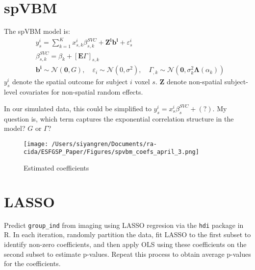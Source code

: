\documentclass[12pt]{article}
\begin{document}
\section*{spVBM}

The spVBM model is:
\[
    \begin{aligned}
         & y_s^i=\sum_{k=1}^K x_{s, k}^i \beta_{s, k}^{S V C}+\mathbf{Z}^{\mathbf{i}} \mathbf{b}^{\mathbf{i}}+\varepsilon_s^i                                                                                                                      \\
         & \beta_{s, k}^{S V C}=\beta_k+[\mathbf{E} \Gamma]_{s, k}                                                                                                                                                                                 \\
         & \mathbf{b}^{\mathbf{i}} \sim \mathcal{N}(\mathbf{0}, G), \quad \varepsilon_i \sim \mathcal{N}\left(0, \sigma^2\right), \quad \Gamma_{, k} \sim \mathcal{N}\left(\mathbf{0}, \sigma_k^2 \boldsymbol{\Lambda}\left(\alpha_k\right)\right)
    \end{aligned}
\]
\(y_s^i\) denote the spatial outcome for subject \(i\) voxel \(s\). \(\mathbf{Z}\) denote non-spatial subject-level covariates for non-spatial random effects.

In our simulated data, this could be simplified to \(y_s^i = x_s^i \beta_s^{SVC} + (?) \). My question is, which term captures the exponential correlation structure in the model? \(G\) or \(\Gamma\)?

\begin{figure}[ht]
    \centering
    \texttt{[image: /Users/siyangren/Documents/ra-cida/ESFGSP\_Paper/Figures/spvbm\_coefs\_april\_3.png]}
    \caption{Estimated coefficients}
    \label{fig:my_label}
\end{figure}

\section*{LASSO}

Predict \texttt{group\_ind} from imaging using LASSO regresion via the \texttt{hdi} package in R. In each iteration, randomly partition the data, fit LASSO to the first subset to identify non-zero coefficients, and then apply OLS using these coefficients on the second subset to estimate p-values. Repeat this process to obtain average p-values for the coefficients.
\end{document}
